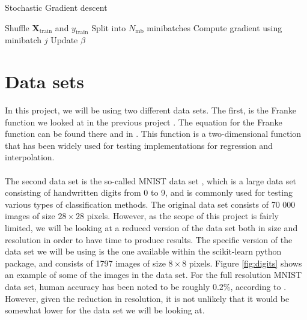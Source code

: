 \documentclass[a4paper]{article}
\newcommand\red[1]{\textcolor{red}{\textbf{#1}}}
\newcommand{\XX}{\mathbf{X}}
\begin{document}
\begin{algorithm}[H]
\caption{Stochastic Gradient descent}
\begin{algorithmic}[1]
\State Shuffle $\XX_{\text{train}}$ and $y_{\text{train}}$
\State Split into $N_{\text{mb}}$ minibatches
\State Compute gradient using minibatch $j$
\State Update $\beta$
\EndFor
\EndFor
\end{algorithmic}
\label{alg:sgd}
\end{algorithm}


\section{Data sets} \label{chap:data_sets}
In this project, we will be using two different data sets. The first, is the Franke function we looked at in the previous project \cite{Github1}. The equation for the Franke function can be found there and in \cite{Franke}. This function is a two-dimensional function that has been widely used for testing implementations for regression and interpolation.
\\\\
%
The second data set is the so-called MNIST data set \cite{MNIST}, which is a large data set consisting of handwritten digits from 0 to 9, and is commonly used for testing various types of classification methods. The original data set consists of 70 000 images of size $28\times28$ pixels. However, as the scope of this project is fairly limited, we will be looking at a reduced version of the data set both in size and resolution in order to have time to produce results. The specific version of the data set we will be using is the one available within the scikit-learn python package, and consists of 1797 images of size $8\times8$ pixels. Figure \ref{fig:digits} shows an example of some of the images in the data set. For the full resolution MNIST data set, human accuracy has been noted to be roughly $0.2$\%, according to \cite{c2012}. However, given the reduction in resolution, it is not unlikely that it would be somewhat lower for the data set we will be looking at.
\end{document}
